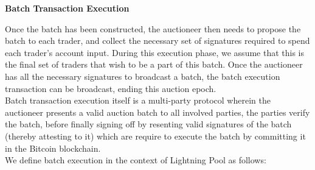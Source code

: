 \documentclass[10pt,a4paper]{article}
\theoremstyle{definition}
\begin{document}
\begin{center}
    \textbf{Batch Transaction Execution}
\end{center}

Once the batch has been constructed, the auctioneer then needs to propose the
batch to each trader, and collect the necessary set of signatures required to
spend each trader's account input. During this execution phase, we assume that
this is the final set of traders that wish to be a part of this batch. Once the
auctioneer has all the necessary signatures to broadcast a batch, the batch
execution transaction can be broadcast, ending this auction epoch.  \\

Batch transaction execution itself is a multi-party protocol wherein the
auctioneer presents a valid auction batch to all involved parties, the parties
verify the batch, before finally signing off by resenting valid signatures of
the batch (thereby attesting to it) which are require to execute the batch by
committing it in the Bitcoin blockchain. \\

We define batch execution in the context of Lightning Pool as follows:
\begin{pcvstack}[boxed,center, space=1em]
\end{pcvstack}
\end{document}
